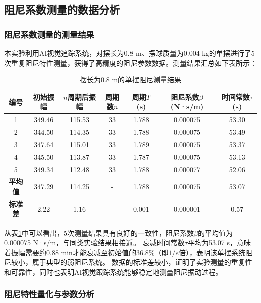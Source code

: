 \subsection{阻尼系数测量的数据分析}


\subsubsection{阻尼系数测量的测量结果}
本实验利用AI视觉追踪系统，对摆长为0.8 m、摆球质量为0.004 kg的单摆进行了5次重复阻尼特性测量，获得了高精度的阻尼参数数据。测量结果汇总如下表所示：

\begin{table}[H]
\centering
\caption{摆长为0.8 m的单摆阻尼测量结果}
\begin{tabular}{@{}c c c c c c c@{}}
\toprule
\textbf{编号} & \textbf{初始振幅} & \textbf{$n$周期后振幅} & \textbf{周期数$n$} & \textbf{周期$T$(s)} & \textbf{阻尼系数$\beta$(N·s/m)} & \textbf{时间常数$\tau$(s)} \\
\midrule
1 & 349.46 & 115.53 & 33 & 1.788 & 0.000075 & 53.30 \\
2 & 344.50 & 114.35 & 33 & 1.788 & 0.000075 & 53.49 \\
3 & 347.64 & 115.01 & 33 & 1.789 & 0.000075 & 53.37 \\
4 & 345.50 & 113.87 & 33 & 1.787 & 0.000075 & 53.13 \\
5 & 349.34 & 112.48 & 33 & 1.788 & 0.000077 & 52.06 \\
\textbf{平均值} & 347.29 & 114.25 & - & 1.788 & 0.000075 & 53.07 \\
\textbf{标准差} & 2.22 & 1.16 & - & 0.001 & 0.000001 & 0.57 \\
\bottomrule
\end{tabular}
\label{tab:damping_results}
\end{table}

\begin{SecondaryBox}[阻尼系数测量结果]
从表\ref{tab:damping_results}中可以看出，5次测量结果具有良好的一致性，阻尼系数$\beta$的平均值为0.000075 N·s/m，与同类实验结果相接近。
衰减时间常数$\tau$平均为53.07 s，意味着振幅需要约0.88 min才能衰减至初始值的36.8\%（即$1/e$倍），表明该单摆系统阻尼较小，属于典型的弱阻尼系统。
数据的标准差较小，证明了实验测量的重复性和可靠性，同时也表明AI视觉跟踪系统能够稳定地测量阻尼振动过程。
\end{SecondaryBox}



\subsubsection{阻尼特性量化与参数分析}

